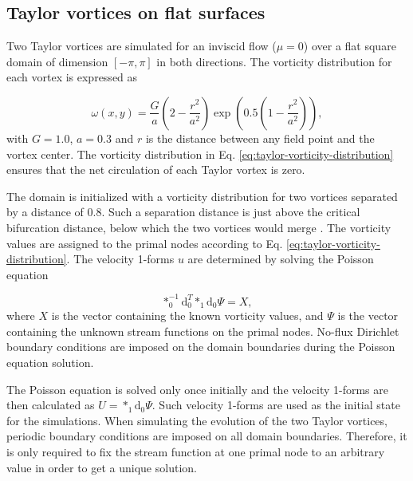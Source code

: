 \documentclass[final,12pt,times]{elsarticle}
\begin{document}

\subsection{Taylor vortices on flat surfaces}
\label{subsec:flat-Taylor-vortices}

Two Taylor vortices are simulated for an inviscid flow ($\mu = 0$) over a flat square domain of dimension $[-\pi, \pi]$ in both directions. The vorticity distribution for each vortex is expressed as \cite{mckenzie2007hola}

\begin{equation}
\label{eq:taylor-vorticity-distribution}
\omega(x,y) = \frac{G}{a} \left( 2-\frac{r^2}{a^2} \right) \exp \left( 0.5 \left( 1-\frac{r^2}{a^2} \right)  \right),
\end{equation}
with $G=1.0$, $a=0.3$ and $r$ is the distance between any field point and the vortex center. The vorticity distribution in Eq. \eqref{eq:taylor-vorticity-distribution} ensures that the net circulation of each Taylor vortex is zero.

The domain is initialized with a vorticity distribution for two vortices separated by a distance of $0.8$. Such a separation distance is just above the critical bifurcation distance, below which the two vortices would merge \cite{mckenzie2007hola,pavlov2011structure}. The vorticity values are assigned to the primal nodes according to Eq. \eqref{eq:taylor-vorticity-distribution}. The velocity 1-forms $u$ are determined by solving the Poisson equation

\begin{equation}
\label{eq:taylor-vorticity-Poisson}
\ast^{-1}_0 \textrm{d}^T_0 \ast_1 \textrm{d}_0 \Psi = X,
\end{equation}
where $X$ is the vector containing the known vorticity values, and $\Psi$ is the vector containing the unknown stream functions on the primal nodes. No-flux Dirichlet boundary conditions are imposed on the domain boundaries during the Poisson equation solution. 

The Poisson equation is solved only once initially and the velocity 1-forms are then calculated as $U=\ast_1 \textrm{d}_0 \Psi$. Such velocity 1-forms are used as the initial state for the simulations. When simulating the evolution of the two Taylor vortices, periodic boundary conditions are imposed on all domain boundaries. Therefore, it is only required to fix the stream function at one primal node to an arbitrary value in order to get a unique solution. 
\end{document}
